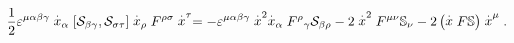 \begin{equation}
\frac{1}{2}\varepsilon ^{\mu \alpha \beta \gamma }\stackrel{.}{x}_{\alpha
}\left[ \mathcal{S}_{\beta \gamma },\mathcal{S}_{\sigma \tau }\right] 
\stackrel{.}{x}_{\rho }F^{\rho \sigma }\stackrel{.}{x}^{\tau }=-\varepsilon
^{\mu \alpha \beta \gamma }\stackrel{.}{x}^{2}\stackrel{.}{x}_{\alpha
}F^{\rho }{}_{\gamma }\mathcal{S}_{\beta \rho }-2\stackrel{.}{x}^{2}F^{\mu
\nu }{}\Bbb{S}_{\nu }-2\left( \stackrel{.}{x}F\Bbb{S}\right) \stackrel{.}{x}%
^{\mu }.
\end{equation}


